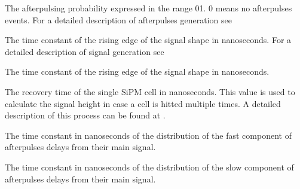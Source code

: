 \documentclass[letterpaper,10pt,english]{sphinxmanual}
\begin{document}
\begin{fulllineitems}
The afterpulsing probability expressed in the range 0\sphinxhyphen{}1. 0 means no afterpulses events. For a detailed description of afterpulses generation see {\hyperref[\detokenize{theory:aptheory}]{}}

\end{fulllineitems}



\begin{fulllineitems}
The time constant of the rising edge of the signal shape in nanoseconds. For a detailed description of signal generation see {\hyperref[\detokenize{theory:sigshapingtheory}]{}}

\end{fulllineitems}



\begin{fulllineitems}
The time constant of the rising edge of the signal shape in nanoseconds.

\end{fulllineitems}



\begin{fulllineitems}
The recovery time of the single SiPM cell in nanoseconds. This value is used to calculate the signal height in case a cell is hitted multiple times. A detailed description of this process can be found at {\hyperref[\detokenize{theory:cellrecoverytheory}]{}}.

\end{fulllineitems}



\begin{fulllineitems}
The time constant in nanoseconds of the distribution of the fast component of afterpulses delays from their main signal.

\end{fulllineitems}



\begin{fulllineitems}
The time constant in nanoseconds of the distribution of the slow component of afterpulses delays from their main signal.

\end{fulllineitems}
\end{document}

